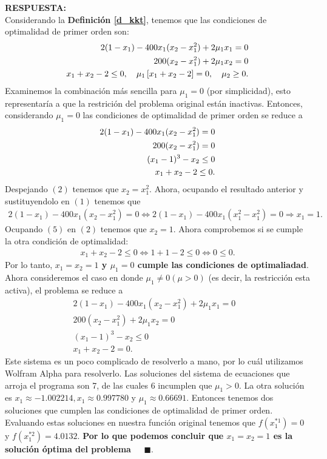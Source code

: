 \documentclass[11pt,letterpaper]{article}
\newcommand{\res}{\textbf{RESPUESTA:}\\}
\newcommand{\fin}{$\blacksquare.$}
\begin{document}
\begin{enumerate}
\begin{itemize}
\res Considerando la \textbf{Definición \ref{d_kkt}}, tenemos que las condiciones de optimalidad de primer orden son:
\begin{align*}\centering
2(1-x_1)-400x_1(x_2-x_1^2)+2\mu_1x_1=0&\\
200(x_2-x_1^2)+2\mu_1x_2=0&\\
x_1+x_2-2\leq 0, \ \ \ \mu_1\left[x_1+x_2-2\right]=0,\ \ \ \mu_2\geq 0.
\end{align*}
Examinemos la combinación más sencilla para $\mu_1=0$ (por simplicidad), esto representaría a que la restrición  del problema original están inactivas. Entonces, considerando $\mu_1=0$ las condiciones de optimalidad de primer orden se reduce a 
\begin{align}\centering
2(1-x_1)-400x_1(x_2-x_1^2)=0&\\
200(x_2-x_1^2)=0&\\
(x_1-1)^3-x_2\leq 0\\
x_1+x_2-2\leq 0.
\end{align}
Despejando $(2)$ tenemos que $x_2=x_1^2$. Ahora, ocupando el resultado anterior y sustituyendolo en $(1)$ tenemos que
\begin{align}
2(1-x_1)-400x_1(x_2-x_1^2)=0 \Leftrightarrow 2(1-x_1)-400x_1(x_1^2-x_1^2)=0 \Rightarrow x_1=1.
\end{align}
Ocupando $(5)$ en $(2)$ tenemos que $x_2=1$. Ahora comprobemos si se cumple la otra condición de optimalidad:
\begin{align*}
x_1+x_2-2\leq 0 \Leftrightarrow 1+1-2\leq 0 \Leftrightarrow 0\leq 0.
\end{align*}
Por lo tanto, \textbf{$x_1=x_2=1$ y $\mu_1=0$ cumple las condiciones de optimaliadad}. Ahora consideremos el caso en donde $\mu_1\neq 0 (\mu >0)$ (es decir, la restricción esta activa), el problema se reduce a 
\begin{align*}
2(1-x_1)-400x_1(x_2-x_1^2)+2\mu_1x_1=0&\\
200(x_2-x_1^2)+2\mu_1x_2=0&\\
(x_1-1)^3-x_2\leq 0\\
x_1+x_2-2=0.
\end{align*}
Este sistema es un poco complicado de resolverlo a mano, por lo cuál utilizamos Wolfram Alpha para resolverlo. Las soluciones del sistema de ecuaciones que arroja el programa son 7, de las cuales 6 incumplen que $\mu_1 >0$. La otra solución es $x_1\approx -1.002214, x_1\approx 0.997780$ y $\mu_1\approx 0.66691$. Entonces tenemos dos soluciones que cumplen las condiciones de optimalidad de primer orden. Evaluando estas soluciones en nuestra función original tenemos que $f(x_1^{*1})=0$ y $f(x_1^{*2})=4.0132.$ \textbf{Por lo que podemos concluir que $x_1=x_2=1$ es la solución óptima del problema \ \ \fin}
\end{itemize}


\end{enumerate}
\end{document}
